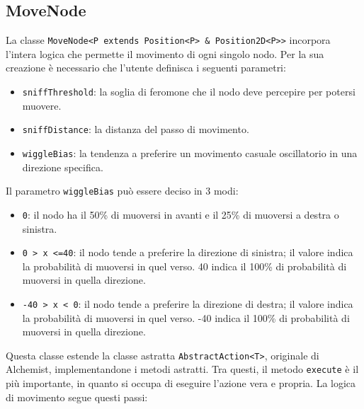 \subsection{MoveNode}
La classe \texttt{MoveNode<P extends Position<P> \& Position2D<P>>} incorpora l'intera logica che permette il movimento di ogni singolo nodo. 
Per la sua creazione è necessario che l'utente definisca i seguenti parametri:
\begin{itemize}
    \item \texttt{sniffThreshold}: la soglia di feromone che il nodo deve percepire per potersi muovere.
    \item \texttt{sniffDistance}: la distanza del passo di movimento.
    \item \texttt{wiggleBias}: la tendenza a preferire un movimento casuale oscillatorio in una direzione specifica.
\end{itemize}
Il parametro \texttt{wiggleBias} può essere deciso in 3 modi:
\begin{itemize}
    \item \texttt{0}: il nodo ha il 50\% di muoversi in avanti e il 25\% di muoversi a destra o sinistra.
    \item \texttt{0 > x <=40}: il nodo tende a preferire la direzione di sinistra; il valore indica la probabilità di muoversi in quel verso.
     40 indica il 100\% di probabilità di muoversi in quella direzione.
    \item \texttt{-40 > x < 0}: il nodo tende a preferire la direzione di destra; il valore indica la probabilità di muoversi in quel verso.
    -40 indica il 100\% di probabilità di muoversi in quella direzione.
\end{itemize}
Questa classe estende la classe astratta \texttt{AbstractAction<T>}, originale di Alchemist, implementandone i metodi astratti.
Tra questi, il metodo \texttt{execute} è il più importante, in quanto si occupa di eseguire l'azione vera e propria.
La logica di movimento segue questi passi:
